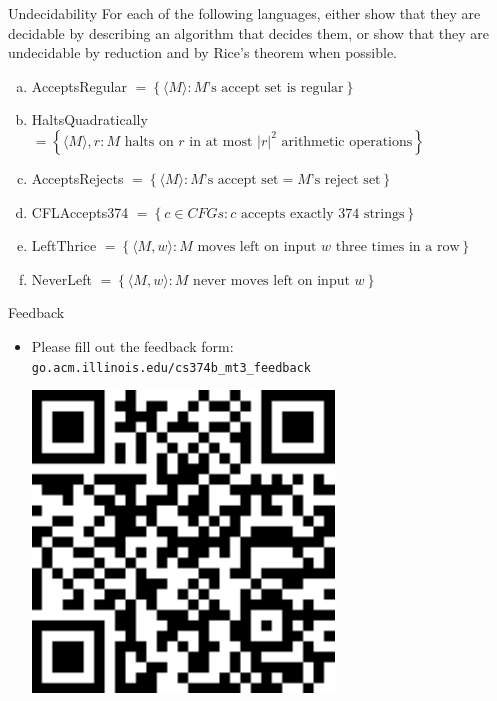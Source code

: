\documentclass{beamer}
\begin{document}
\begin{frame}[t]{Undecidability}
    For each of the following languages, either show that they are decidable by describing an algorithm that decides them, or show that they are undecidable by reduction and by Rice's theorem when possible.

    \begin{enumerate}[(a)]
        \item AcceptsRegular $= \left\{\langle M \rangle: M\text{'s accept set is regular}\right\}$
        \pause \item HaltsQuadratically $= \left\{\langle M \rangle, r: M \text{ halts on } r \text{ in at most } |r|^2 \text{ arithmetic operations}\right\}$
        \pause \item AcceptsRejects $= \left\{\langle M \rangle: M\text{'s accept set} = M\text{'s reject set}\right\}$
        \pause \item CFLAccepts374 $= \left\{c \in CFGs: c \text{ accepts exactly 374 strings}\right\}$
        \pause \item LeftThrice $= \left\{\langle M, w \rangle: M \text{ moves left on input } w \text{ three times in a row}\right\}$
        \pause \item NeverLeft $= \left\{\langle M, w \rangle: M \text{ never moves left on input } w\right\}$
    \end{enumerate}
\end{frame}

\begin{frame}[t]{Feedback}
    \begin{itemize}
        \item Please fill out the feedback form: \texttt{go.acm.illinois.edu/cs374b\_mt3\_feedback}\vspace{.05\textwidth}\begin{center}
            \includegraphics[height=.5\textwidth]{feedback.pdf}
        \end{center}
    \end{itemize}
\end{frame}
\end{document}

